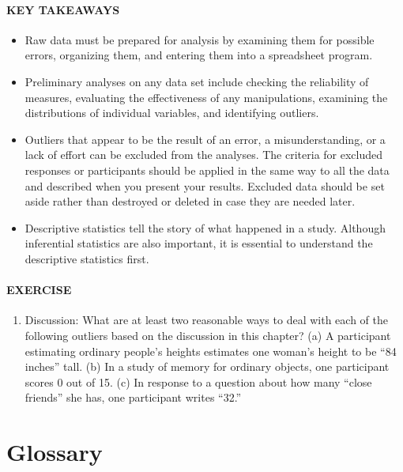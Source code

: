 \documentclass[
]{krantz}
\providecommand{\tightlist}{%
  \setlength{\itemsep}{0pt}\setlength{\parskip}{0pt}}
\begin{document}
\paragraph*{KEY TAKEAWAYS}\label{key-takeaways-35}

\begin{itemize}
\tightlist
\item
  Raw data must be prepared for analysis by examining them for possible errors, organizing them, and entering them into a spreadsheet program.
\item
  Preliminary analyses on any data set include checking the reliability of measures, evaluating the effectiveness of any manipulations, examining the distributions of individual variables, and identifying outliers.
\item
  Outliers that appear to be the result of an error, a misunderstanding, or a lack of effort can be excluded from the analyses. The criteria for excluded responses or participants should be applied in the same way to all the data and described when you present your results. Excluded data should be set aside rather than destroyed or deleted in case they are needed later.
\item
  Descriptive statistics tell the story of what happened in a study. Although inferential statistics are also important, it is essential to understand the descriptive statistics first.
\end{itemize}

\paragraph*{EXERCISE}\label{exercise-8}

\begin{enumerate}
\def\labelenumi{\arabic{enumi}.}
\tightlist
\item
  Discussion: What are at least two reasonable ways to deal with each of the following outliers based on the discussion in this chapter? (a) A participant estimating ordinary people's heights estimates one woman's height to be ``84 inches'' tall. (b) In a study of memory for ordinary objects, one participant scores 0 out of 15. (c) In response to a question about how many ``close friends'' she has, one participant writes ``32.''
\end{enumerate}

\section{Glossary}\label{glossary-12}
\end{document}
